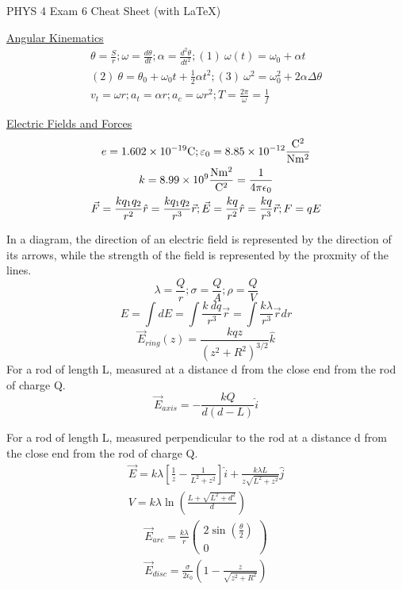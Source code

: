 \documentclass[8pt]{minimal}
\begin{document}
\twocolumn
PHYS 4 Exam 6 Cheat Sheet (with \LaTeX)

\underline{Angular Kinematics}
\begin{gather*}
    \theta = \frac{S}{r}; \omega = \frac{d\theta}{dt}; \alpha = \frac{d^2\theta}{dt^2}; (1)\ \omega(t) = \omega_0 + \alpha t\\
    (2)\ \theta = \theta_0 + \omega_0t + \frac{1}{2}\alpha t^2; (3)\ \omega^2 = \omega_0^2 + 2\alpha\Delta\theta\\
    v_t = \omega r; a_t = \alpha r; a_c = \omega r^2; T = \frac{2 \pi}{\omega} = \frac{1}{f}
\end{gather*}

\underline{Electric Fields and Forces}
\begin{gather*}
    e = 1.602 \times 10^{-19} \unit{\coulomb}; \varepsilon_0 = 8.85 \times 10^{-12} \unit{\frac{\coulomb^2}{\newton\meter^2}}\\
    k = 8.99 \times 10^9 \unit{\frac{\newton\meter^2}{\coulomb^2}}= \frac{1}{4\pi\epsilon_0}\\
    \vec{F} = \frac{kq_1q_2}{r^2}\hat{r} = \frac{kq_1q_2}{r^3}\vec{r};
    \vec{E} = \frac{kq}{r^2}\hat{r} = \frac{kq}{r^3}\vec{r}; F = qE
\end{gather*}

In a diagram, the direction of an electric field is represented by the direction of its arrows, while the strength of the field is represented by the proxmity of the lines.
\[\lambda = \frac{Q}{r} ; \sigma = \frac{Q}{A} ; \rho = \frac{Q}{V}\]
\[E = \int dE = \int \frac{k\ dq}{r^3}\vec{r} = \int \frac{k \lambda}{r^3}\vec{r}dr\]
\[ \vec{E}_{ring}(z) = \frac{kqz}{(z^2 + R^2)^{3/2}}\hat{k} \]
For a rod of length L, measured at a distance d from the close end from the rod of charge Q.
\[ \vec{E}_{axis} = -\frac{kQ}{d(d-L)}\hat{i} \]

For a rod of length L, measured perpendicular to the rod at a distance d from the close end from the rod of charge Q.
\begin{gather*}
    \vec{E} = k\lambda \left[ \frac{1}{z} - \frac{1}{L^2 + z^2} \right]\hat{i} + \frac{k\lambda L}{z\sqrt{L^2 + z^2}} \hat{j}\\
    V = k\lambda\ln\left(\frac{L + \sqrt{L^2 + d^2}}{d}\right)
\end{gather*}
\begin{gather*}
    \vec{E}_{arc} = \frac{k\lambda}{r} \begin{pmatrix}2\sin(\frac{\theta}{2})\\0\end{pmatrix}\\
    \vec{E}_{disc} = \frac{\sigma}{2\epsilon_0} \left(1 - \frac{z}{\sqrt{z^2 + R^2}}\right)
\end{gather*}
\end{document}
